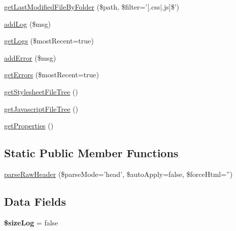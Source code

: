 \begin{DoxyCompactItemize}
\item 
\hyperlink{class_js_css_chunker_aee9eb602587067c3712307deb8873dc0}{getLastModifiedFileByFolder} (\$path, \$filter='\mbox{[}.css$|$.js\mbox{]}\$')
\item 
\hyperlink{class_js_css_chunker_aa38326093bdc56769bae1e7b5bc6ae27}{addLog} (\$msg)
\item 
\hyperlink{class_js_css_chunker_ac9b0d6884469e0666b9a9c4981f7318e}{getLogs} (\$mostRecent=true)
\item 
\hyperlink{class_js_css_chunker_af6642f557316ed7df113bdf77aae3446}{addError} (\$msg)
\item 
\hyperlink{class_js_css_chunker_ab380fa3025bb07475ad8b72a58afe916}{getErrors} (\$mostRecent=true)
\item 
\hyperlink{class_js_css_chunker_a24af374e9c031780e6d9706026be5051}{getStylesheetFileTree} ()
\item 
\hyperlink{class_js_css_chunker_a61406be3290066d74f435f617cd4897b}{getJavascriptFileTree} ()
\item 
\hyperlink{class_js_css_chunker_ad92c14b6c86304d3f1fb86b2936d3408}{getProperties} ()
\end{DoxyCompactItemize}
\subsection*{Static Public Member Functions}
\begin{DoxyCompactItemize}
\item 
\hyperlink{class_js_css_chunker_ac32c20b2f951ab2438e316fe389e75f7}{parseRawHeader} (\$parseMode='head', \$autoApply=false, \$forceHtml='')
\end{DoxyCompactItemize}
\subsection*{Data Fields}
\begin{DoxyCompactItemize}
\item 
\hypertarget{class_js_css_chunker_a0b79a23bdabea1ec46ecb0842f0962f2}{
{\bfseries \$sizeLog} = false}
\label{class_js_css_chunker_a0b79a23bdabea1ec46ecb0842f0962f2}

\end{DoxyCompactItemize}
